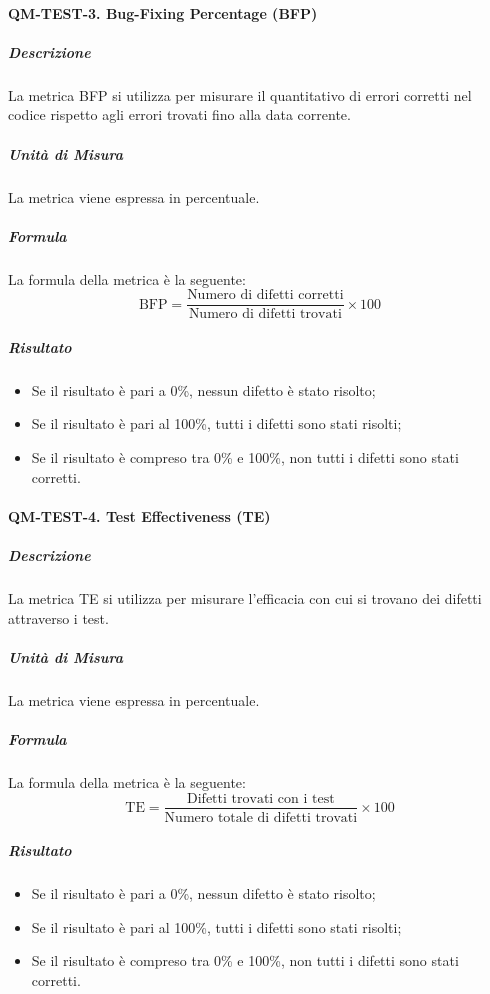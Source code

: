 		\paragraph{QM-TEST-3. Bug-Fixing Percentage (BFP)}

			\subparagraph{Descrizione}
			La metrica BFP si utilizza per misurare il quantitativo di errori corretti nel codice rispetto agli errori trovati fino alla data corrente.

			\subparagraph{Unità di Misura}
			La metrica viene espressa in percentuale.

			\subparagraph{Formula}
			La formula della metrica è la seguente:
			\[
				\text{BFP} = \frac{\text{Numero di difetti corretti}}{\text{Numero di difetti trovati}} \times 100
			\]

			\subparagraph{Risultato}
			\begin{itemize}
				\item Se il risultato è pari a 0\%, nessun difetto è stato risolto;
				\item Se il risultato è pari al 100\%, tutti i difetti sono stati risolti;
				\item Se il risultato è compreso tra 0\% e 100\%, non tutti i difetti sono stati corretti.
			\end{itemize}

		\paragraph{QM-TEST-4. Test Effectiveness (TE)}

			\subparagraph{Descrizione}
			La metrica TE si utilizza per misurare l'efficacia con cui si trovano dei difetti attraverso i test.

			\subparagraph{Unità di Misura}
			La metrica viene espressa in percentuale.

			\subparagraph{Formula}
			La formula della metrica è la seguente:
			\[
				\text{TE} = \frac{\text{Difetti trovati con i test}}{\text{Numero totale di difetti trovati}} \times 100
			\]

			\subparagraph{Risultato}
			\begin{itemize}
				\item Se il risultato è pari a 0\%, nessun difetto è stato risolto;
				\item Se il risultato è pari al 100\%, tutti i difetti sono stati risolti;
				\item Se il risultato è compreso tra 0\% e 100\%, non tutti i difetti sono stati corretti.
			\end{itemize}


